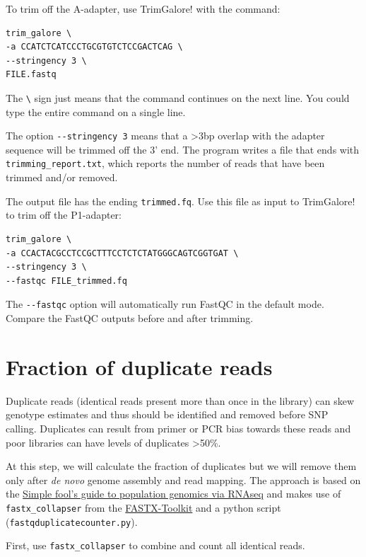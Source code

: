 \documentclass[11pt]{article}
\begin{document}
To trim off the A-adapter, use TrimGalore! with the command:

\begin{verbatim}
trim_galore \
-a CCATCTCATCCCTGCGTGTCTCCGACTCAG \
--stringency 3 \
FILE.fastq
\end{verbatim}

The \texttt{\textbackslash{}} sign just means that the command continues on the next
line. You could type the entire command on a single line.


The option \texttt{-{}-stringency 3} means that a >3bp overlap with the adapter
sequence will be trimmed off the 3' end. The program writes a file
that ends with \texttt{trimming\_report.txt}, which reports the number of
reads that have been trimmed and/or removed.

The output file has the ending \texttt{trimmed.fq}. Use this file as
input to TrimGalore! to trim off the P1-adapter:

\begin{verbatim}
trim_galore \
-a CCACTACGCCTCCGCTTTCCTCTCTATGGGCAGTCGGTGAT \
--stringency 3 \
--fastqc FILE_trimmed.fq
\end{verbatim}

The \texttt{-{}-fastqc} option will automatically run FastQC in the default
mode. Compare the FastQC outputs before and after trimming.


\clearpage

\section{Fraction of duplicate reads}
\label{sec-4}
Duplicate reads (identical reads present more than once in the
library) can skew genotype estimates and thus should be identified and
removed before SNP calling. Duplicates can result from primer or PCR
bias towards these reads and poor libraries can have levels of
duplicates >50\%.

At this step, we will calculate the fraction of duplicates but we will
remove them only after \emph{de novo} genome assembly and read mapping.
The approach is based on the \href{http://sfg.stanford.edu/SFG.pdf}{Simple fool's guide to population
genomics via RNAseq} and makes use of \texttt{fastx\_collapser} from the
\href{http://hannonlab.cshl.edu/fastx_toolkit/}{FASTX-Toolkit} and a python script (\texttt{fastqduplicatecounter.py}).

First, use \texttt{fastx\_collapser} to combine and count all identical reads.
\end{document}
